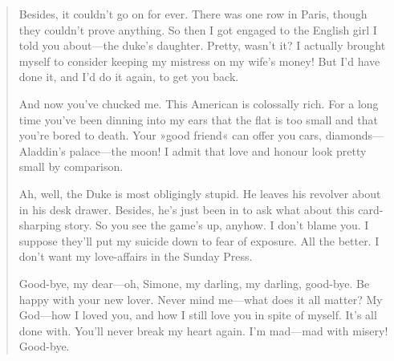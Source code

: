 \begin{quotation}
Besides, it couldn't go on for ever. There was one row in Paris,
though they couldn't prove anything. So then I got engaged to the
English girl I told you about—the duke's daughter. Pretty, wasn't it?
I actually brought myself to consider keeping my mistress on my wife's
money! But I'd have done it, and I'd do it again, to get you back.

And now you've chucked me. This American is colossally rich. For a
long time you've been dinning into my ears that the flat is too small
and that you're bored to death. Your »good friend« can offer you cars,
diamonds—Aladdin's palace—the moon! I admit that love and honour look
pretty small by comparison.

Ah, well, the Duke is most obligingly stupid. He leaves his revolver
about in his desk drawer. Besides, he's just been in to ask what about
this card-sharping story. So you see the game's up, anyhow. I don't
blame you. I suppose they'll put my suicide down to fear of exposure.
All the better. I don't want my love-affairs in the Sunday Press.

Good-bye, my dear—oh, Simone, my darling, my darling, good-bye. Be
happy with your new lover. Never mind me—what does it all matter? My
God—how I loved you, and how I still love you in spite of myself.
It's all done with. You'll never break my heart again. I'm mad—mad
with misery! Good-bye.

\end{quotation}
